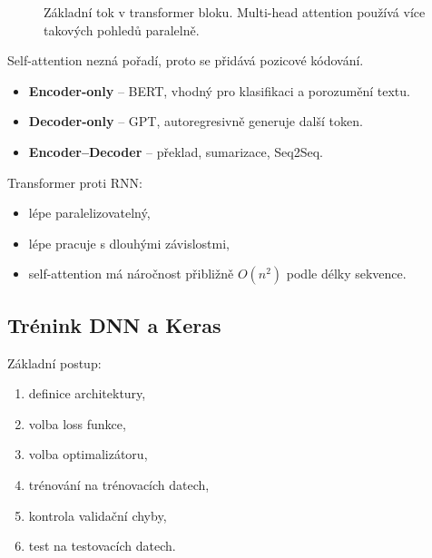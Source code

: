 \begin{figure}[H]
    \centering
    \caption{Základní tok v transformer bloku. Multi-head attention používá více takových pohledů paralelně.}
\end{figure}

Self-attention nezná pořadí, proto se přidává pozicové kódování.

\begin{itemize}
    \item \textbf{Encoder-only} -- BERT, vhodný pro klasifikaci a porozumění textu.
    \item \textbf{Decoder-only} -- GPT, autoregresivně generuje další token.
    \item \textbf{Encoder--Decoder} -- překlad, sumarizace, Seq2Seq.
\end{itemize}

Transformer proti RNN:
\begin{itemize}
    \item lépe paralelizovatelný,
    \item lépe pracuje s dlouhými závislostmi,
    \item self-attention má náročnost přibližně \(O(n^2)\) podle délky sekvence.
\end{itemize}

\subsection*{Trénink DNN a Keras}
Základní postup:
\begin{enumerate}
    \item definice architektury,
    \item volba loss funkce,
    \item volba optimalizátoru,
    \item trénování na trénovacích datech,
    \item kontrola validační chyby,
    \item test na testovacích datech.
\end{enumerate}

